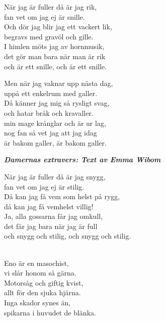 När jag är fuller då är jag rik,\\
fan vet om jag ej är snille.\\
Och dör jag blir jag ett vackert lik,\\
begravs med gravöl och gille.\\
I himlen möts jag av hornmusik,\\
det gör man bara när man är rik\\
och är ett snille, och är ett snille.

\newpage 

Men när jag vaknar upp nästa dag,\\
uppå ett enkelrum med galler.\\
Då känner jag mig så rysligt svag,\\
och hatar bråk och kravaller.\\
min mage krånglar och är ur lag,\\
nog fan så vet jag att jag idag\\
är bakom galler, är bakom galler.


\textbf{\textit{Damernas extravers: Text av Emma Wibom}}

När jag är fuller då är jag snygg,\\
fan vet om jag ej är stilig.\\
Då kan jag få vem som helst på rygg,\\
då kan jag få vemhelst villig!\\
Ja, alla gossarna får jag omkull,\\
det får jag bara när jag är full\\
och snygg och stilig, och snygg och stilig.\\

 \\       

\songtext{}
Eno är en masochist,\\
vi slår honom så gärna.\\
Motorsåg och giftig kvist,\\
allt för den sjuka hjärna.\\
Inga skador synes än,\\
spikarna i huvudet de blänka.\\

 \\       

